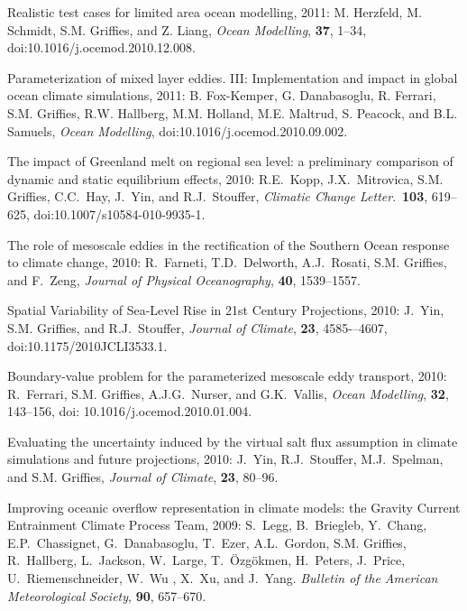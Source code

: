 \begin{etaremune}
\item Realistic test cases for limited area ocean modelling, 2011: M. Herzfeld, M. Schmidt, S.M. Grif\/f\/ies, and Z. Liang, {\it    Ocean Modelling}, {\bf 37}, 1--34, doi:10.1016/j.ocemod.2010.12.008.

\item Parameterization of mixed layer eddies. III: Implementation and impact in global ocean climate simulations, 2011: B. Fox-Kemper,
  G. Danabasoglu, R. Ferrari, S.M. Grif\/f\/ies, R.W. Hallberg, M.M. Holland, M.E. Maltrud, S. Peacock, and B.L. Samuels, {\it Ocean Modelling}, doi:10.1016/j.ocemod.2010.09.002.

\item The impact of Greenland melt on regional sea level: a preliminary comparison of dynamic and static equilibrium effects, 2010: R.E.\ Kopp, J.X.\ Mitrovica, S.M. Grif\/f\/ies, C.C.\  Hay, J.\ Yin, and R.J.\ Stouffer, {\it Climatic Change Letter}.\,
  {\bf 103}, 619--625, doi:10.1007/s10584-010-9935-1.

\item The role of mesoscale eddies in the rectification of the Southern Ocean response to climate change, 2010: R.\ Farneti, T.D.\
  Delworth, A.J.\ Rosati, S.M. Grif\/f\/ies, and F.\ Zeng, {\it Journal of Physical Oceanography}, {\bf 40}, 1539--1557.

\item Spatial Variability of Sea-Level Rise in 21st Century Projections, 2010: J.\ Yin, S.M. Grif\/f\/ies, and R.J.\ Stouffer, {\it Journal of Climate}, {\bf 23}, 4585-–4607,
doi:10.1175/2010JCLI3533.1.

\item Boundary-value problem for the parameterized mesoscale eddy transport, 2010: R.\ Ferrari, S.M. Grif\/f\/ies, A.J.G.\
  Nurser, and G.K.\ Vallis, {\em Ocean Modelling}, {\bf 32}, 143--156, doi: 10.1016/j.ocemod.2010.01.004.

\item Evaluating the uncertainty induced by the virtual salt flux assumption in climate simulations and future projections, 2010: J.\
  Yin, R.J.\ Stouffer, M.J.\ Spelman, and S.M. Grif\/f\/ies, {\em Journal of Climate}, {\bf 23}, 80--96.

\item Improving oceanic overflow representation in climate models: the   Gravity Current Entrainment Climate Process Team, 2009: S.\ Legg, B.\ Briegleb, Y.\ Chang, E.P.\ Chassignet, G.\ Danabasoglu, T.\
  Ezer, A.L.\ Gordon, S.M. Grif\/f\/ies, R.\ Hallberg, L.\ Jackson, W.\ Large, T.\ \"Ozg\"okmen, H.\ Peters, J.\ Price, U.\
  Riemenschneider, W.\ Wu , X.\ Xu, and J.\ Yang.  {\em Bulletin of the American Meteorological Society}, {\bf 90}, 657--670.


\end{etaremune}
